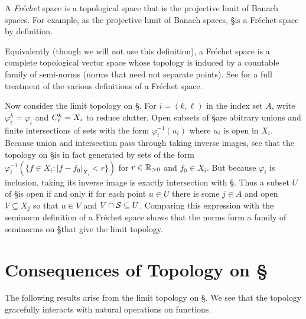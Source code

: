       \begin{defn}
        A \emph{Fr\'echet} space is a topological space that is the projective limit of Banach spaces.
        For example, as the projective limit of Banach spaces, \S is a Fr\'echet space by definition.

        Equivalently (though we will not use this definition), a Fr\'echet space is a complete topological vector space whose topology is induced by a countable family of semi-norms (norms that need not separate points).
        See \citet[]{functionsoncircles} for a full treatment of the various definitions of a Fr\'echet space.
      \end{defn}

      Now consider the limit topology on \S.
      For $i=(k,\ell)$ in the index set $A$, write $\varphi^k_\ell = \varphi_i$ and $\Ckl=X_i$ to reduce clutter.
      Open subsets of \S are abitrary unions and finite intersections of sets with the form $\varphi_i^{-1}(u_i)$ where $u_i$ is open in $X_i$.
      Because union and intersection pass through taking inverse images, see that the topology on \S is in fact generated by sets of the form $\varphi_i^{-1}(\{f\in X_i:|f-f_0|_{X_i}<r\})$ for $r\in\R_{>0}$ and $f_0\in X_i$.
      But because $\varphi_i$ is inclusion, taking its inverse image is exactly intersection with \S.
      Thus a subset $U$ of \S is open if and only if for each point $u\in U$ there is some $j\in A$ and open $V\subseteq X_j$ so that $u\in V$ and $V\cap\S\subseteq U$.
      Comparing this expression with the seminorm definition of a Fr\'echet space shows that the \Ckl norms form a family of seminorms on \S that give the limit topology.


    \section{Consequences of Topology on \S}
      The following results arise from the limit topology on \S.
      We see that the topology gracefully interacts with natural operations on functions.

